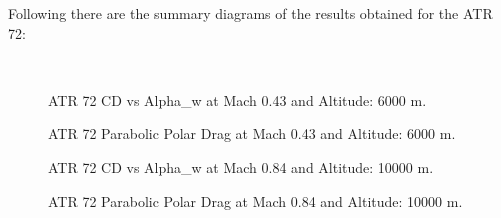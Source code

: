 Following there are the summary diagrams of the results obtained for the ATR 72:

\noindent \\

\begin{figure}[H]
\centering

\caption{ATR 72 CD vs Alpha_w at Mach 0.43 and Altitude: 6000 m.}
\label{fig:DragATR}
\end{figure}


\begin{figure}[H]
\centering

\caption{ATR 72 Parabolic Polar Drag at Mach 0.43 and Altitude: 6000 m.}
\label{fig:DragATR}
\end{figure}

%
%
%
%
%
%
% 
% 
%	 	 


\begin{figure}[H]
\centering

\caption{ATR 72 CD vs Alpha_w at Mach 0.84 and Altitude: 10000 m.}
\label{fig:DragATR}
\end{figure}


\begin{figure}[H]
\centering

\caption{ATR 72 Parabolic Polar Drag at Mach 0.84 and Altitude: 10000 m.}
\label{fig:DragATR}
\end{figure}


